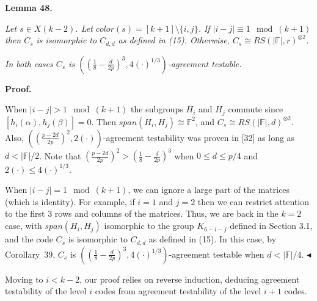 \documentclass[10pt,a4paper]{article}
\begin{document}


\par\medskip\noindent\textbf{
\textbf{Lemma 48}\textbf{.}
}\par



\emph{Let $s\in X(k-2)$. Let $color(s)=[k+1]\setminus\{i,j\}$. If $|i-j|\equiv 1\mod(k+1)$ then $C_{s}$ is isomorphic to $C_{d,d}$ as defined in (15).
Otherwise, $C_{s}\cong RS(\lvert\mathbb{F}\rvert,r)^{\otimes 2}$.}\par




\emph{In both cases $C_{s}$ is $\left(\left(\frac{1}{8}-\frac{d}{2p}\right)^{3},4(\cdot)^{1/3}\right)$-agreement testable.}\par






\par\medskip\noindent\textbf{Proof.}\par




When $\lvert i-j\rvert>1\mod(k+1)$ the subgroups $H_{i}$ and $H_{j}$ commute since $[h_{i}(\alpha),h_{j}(\beta)]=0$. Then $span(H_{i},H_{j})\cong\mathbb{F}^{2}$, and $C_{s}\cong RS(\lvert\mathbb{F}\rvert,d)^{\otimes 2}$. Also, $\left(\left(\frac{p-2d}{2p}\right)^{2},2(\cdot)\right)$-agreement testability was proven in [32] as long as $d<\lvert\mathbb{F}\rvert/2$. Note that $\left(\frac{p-2d}{2p}\right)^{2}>\left(\frac{1}{8}-\frac{d}{2p}\right)^{3}$ when $0\leq d\leq p/4$ and $2(\cdot)\leq 4(\cdot)^{1/3}$.\par




When $\lvert i-j\rvert=1\mod(k+1)$, we can ignore a large part of the matrices (which is identity). For example, if $i=1$ and $j=2$ then we can restrict attention to the first $3$ rows and columns of the matrices. Thus, we are back in the $k=2$ case, with $span(H_{i},H_{j})$ isomorphic to the group $K_{6-i-j}$ defined in Section 3.1, and the code $C_{s}$ is isomorphic to $C_{d,d}$ as defined in (15). In this case, by Corollary 39, $C_{s}$ is $\left(\left(\frac{1}{8}-\frac{d}{2p}\right)^{3},4(\cdot)^{1/3}\right)$-agreement testable when $d<|\mathbb{F}|/4$.
$\blacktriangleleft$\par




Moving to $i<k-2$, our proof relies on reverse induction, deducing agreement testability of the level $i$ codes from agreement testability of the level $i+1$ codes.\par
\end{document}
